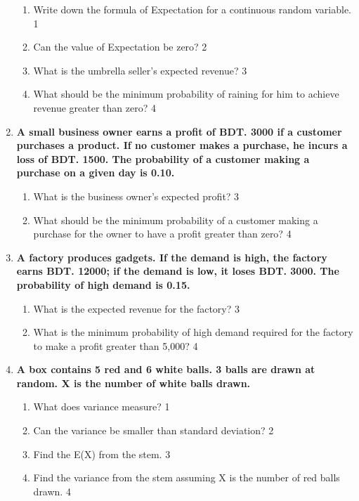 \documentclass[a4paper,oneside, margin=1.4in]{book}
\begin{document}
\begin{enumerate}
  \begin{enumerate}
    \item
	Write down the formula of Expectation for a continuous random variable. \hfill 1
    \item
	Can the value of Expectation be zero? \hfill 2
    \item  
	What is the umbrella seller's expected revenue? \hfill 3
    \item
	What should be the minimum probability of raining for him to achieve revenue greater than zero? \hfill 4
  \end{enumerate}
  
  \item
\textbf{A small business owner earns a profit of BDT. 3000 if a customer purchases a product. If no customer makes a purchase, he incurs a loss of BDT. 1500. The probability of a customer making a purchase on a given day is 0.10.} 

\begin{enumerate}
    \item
    What is the business owner's expected profit? \hfill 3

    \item
    What should be the minimum probability of a customer making a purchase for the owner to have a profit greater than zero? \hfill 4
\end{enumerate}

\item
\textbf{A factory produces gadgets. If the demand is high, the factory earns BDT. 12000; if the demand is low, it loses BDT. 3000. The probability of high demand is 0.15.}

\begin{enumerate}
    \item
    What is the expected revenue for the factory? \hfill 3

    \item
    What is the minimum probability of high demand required for the factory to make a profit greater than 5,000? \hfill 4
\end{enumerate}

  
     \item
	  \textbf{A box contains 5 red and 6 white balls. 3 balls are drawn at random. X is the number of white balls drawn.} 
  
  \begin{enumerate}
    \item
	What does variance measure? \hfill 1
    \item
	Can the variance be smaller than standard deviation? \hfill 2
    \item  
	Find the E(X) from the stem. \hfill 3
    \item
	Find the variance from the stem assuming X is the number of red balls drawn. \hfill 4
  \end{enumerate}
  

\end{enumerate}
\end{document}
